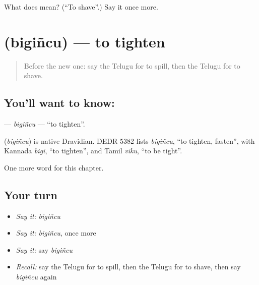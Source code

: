 \begin{tcolorbox}[breakable,colback=teal!4,colframe=teal!35!black,title={Before you move on}]
What does  mean? (\textquotedblleft{}To shave\textquotedblright{}.) Say it once more.
\end{tcolorbox}
\section[\texorpdfstring{\te{బిగించు} (bigiñcu)}{బిగించు (bigiñcu)}]{ (bigiñcu) — to tighten}

\label{lesson:TE-C165-bigincu}



\begin{quote}
Before the new one: say the Telugu for to spill, then the Telugu for to shave.
\end{quote}

\subsection*{You'll want to know: }
\textbf{} — \emph{bigiñcu} — \textquotedblleft{}to tighten\textquotedblright{}.

\begin{cousinweb}
\textbf{} (\emph{bigiñcu}) is native Dravidian. DEDR 5382 lists \emph{bigiñcu}, \textquotedblleft{}to tighten, fasten\textquotedblright{}, with Kannada \emph{bigi}, \textquotedblleft{}to tighten\textquotedblright{}, and Tamil \emph{viku}, \textquotedblleft{}to be tight\textquotedblright{}.
\end{cousinweb}

\begin{grammarlens}[title={What you've built}]
One more word for this chapter.
\end{grammarlens}

\subsection*{Your turn}
\begin{itemize}
\raggedright
  \item \emph{Say it:} \emph{bigiñcu}
  \item \emph{Say it:} \emph{bigiñcu}, once more
  \item \emph{Say it:} say \emph{bigiñcu}
  \item \emph{Recall:} say the Telugu for to spill, then the Telugu for to shave, then say \emph{bigiñcu} again
\end{itemize}

